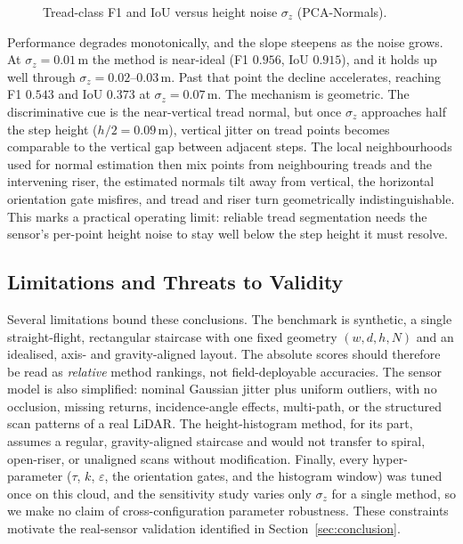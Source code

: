 \begin{figure}[t]\centering
{}
\caption{Tread-class F1 and IoU versus height noise $\sigma_z$ (PCA-Normals).}
\label{fig:noise}
\end{figure}

Performance degrades monotonically, and the slope steepens as the noise
grows. At $\sigma_z=0.01$\,m the method is near-ideal (F1 $0.956$, IoU
$0.915$), and it holds up well through $\sigma_z=0.02$--$0.03$\,m. Past that
point the decline accelerates, reaching F1 $0.543$ and IoU $0.373$ at
$\sigma_z=0.07$\,m. The mechanism is geometric. The discriminative cue is
the near-vertical tread normal, but once $\sigma_z$ approaches half the step
height ($h/2=0.09$\,m), vertical jitter on tread points becomes comparable
to the vertical gap between adjacent steps. The local neighbourhoods used
for normal estimation then mix points from neighbouring treads and the
intervening riser, the estimated normals tilt away from vertical, the
horizontal orientation gate misfires, and tread and riser turn
geometrically indistinguishable. This marks a practical operating limit:
reliable tread segmentation needs the sensor's per-point height noise to
stay well below the step height it must resolve.

\subsection{Limitations and Threats to Validity}

Several limitations bound these conclusions. The benchmark is synthetic, a
single straight-flight, rectangular staircase with one fixed geometry
$(w,d,h,N)$ and an idealised, axis- and gravity-aligned layout. The
absolute scores should therefore be read as \emph{relative} method
rankings, not field-deployable accuracies. The sensor model is also
simplified: nominal Gaussian jitter plus uniform outliers, with no
occlusion, missing returns, incidence-angle effects, multi-path, or the
structured scan patterns of a real LiDAR. The height-histogram method, for
its part, assumes a regular, gravity-aligned staircase and would not
transfer to spiral, open-riser, or unaligned scans without modification.
Finally, every hyper-parameter ($\tau$, $k$, $\varepsilon$, the orientation
gates, and the histogram window) was tuned once on this cloud, and the
sensitivity study varies only $\sigma_z$ for a single method, so we make no
claim of cross-configuration parameter robustness. These constraints
motivate the real-sensor validation identified in
Section~\ref{sec:conclusion}.

